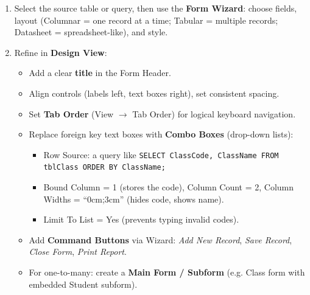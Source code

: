 \documentclass[11pt]{article}
\begin{document}
\begin{methode}
\begin{enumerate}
\item Select the source table or query, then use the \textbf{Form Wizard}: choose fields, layout (Columnar = one record at a time; Tabular = multiple records; Datasheet = spreadsheet-like), and style.
\item Refine in \textbf{Design View}:
\begin{itemize}
\item Add a clear \textbf{title} in the Form Header.
\item Align controls (labels left, text boxes right), set consistent spacing.
\item Set \textbf{Tab Order} (View $\rightarrow$ Tab Order) for logical keyboard navigation.
\item Replace foreign key text boxes with \textbf{Combo Boxes} (drop-down lists):
\begin{itemize}
\item Row Source: a query like \texttt{SELECT ClassCode, ClassName FROM tblClass ORDER BY ClassName;}
\item Bound Column = 1 (stores the code), Column Count = 2, Column Widths = ``0cm;3cm'' (hides code, shows name).
\item Limit To List = Yes (prevents typing invalid codes).
\end{itemize}
\item Add \textbf{Command Buttons} via Wizard: \emph{Add New Record}, \emph{Save Record}, \emph{Close Form}, \emph{Print Report}.
\item For one-to-many: create a \textbf{Main Form / Subform} (e.g. Class form with embedded Student subform).
\end{itemize}
\end{enumerate}
\end{methode}
\end{document}
